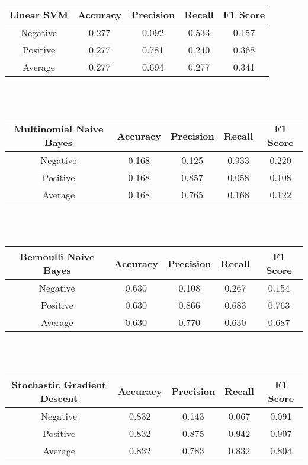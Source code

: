 \documentclass[letterpaper]{article}
\begin{document}
\begin{tabular}{c | c c c c}
\textbf{Linear SVM} & Accuracy  & Precision & Recall    & F1 Score  \\
\hline
Negative        & 0.277     & 0.092     & 0.533     & 0.157     \\
Positive        & 0.277     & 0.781     & 0.240     & 0.368     \\
Average         & 0.277     & 0.694     & 0.277     & 0.341     \\
\end{tabular} \\ \\



\begin{tabular}{c | c c c c}
\textbf{Multinomial Naive Bayes}    & Accuracy  & Precision & Recall    & F1 Score  \\
\hline
Negative        & 0.168     & 0.125     & 0.933     & 0.220     \\
Positive        & 0.168     & 0.857     & 0.058     & 0.108     \\
Average         & 0.168     & 0.765     & 0.168     & 0.122     \\
\end{tabular} \\ \\



\begin{tabular}{c | c c c c}
\textbf{Bernoulli Naive Bayes}  & Accuracy  & Precision & Recall    & F1 Score  \\
\hline
Negative        & 0.630     & 0.108     & 0.267     & 0.154     \\
Positive        & 0.630     & 0.866     & 0.683     & 0.763     \\
Average         & 0.630     & 0.770     & 0.630     & 0.687     \\
\end{tabular} \\ \\



\begin{tabular}{c | c c c c}
\textbf{Stochastic Gradient Descent}    & Accuracy  & Precision & Recall    & F1 Score  \\
\hline
Negative        & 0.832     & 0.143     & 0.067     & 0.091     \\
Positive        & 0.832     & 0.875     & 0.942     & 0.907     \\
Average         & 0.832     & 0.783     & 0.832     & 0.804     \\
\end{tabular} \\ \\
\end{document}

